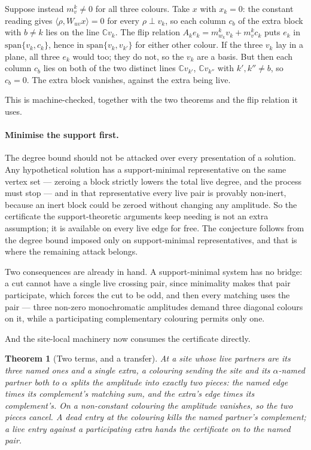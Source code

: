 \documentclass[11pt]{article}
\newtheorem{theorem}{Theorem}[section]
\theoremstyle{definition}
\theoremstyle{remark}
\begin{document}
Suppose instead $m_v^k \neq 0$ for all three colours. Take $x$ with $x_k = 0$: the constant
reading gives $\langle \rho, W_{uv}x\rangle = 0$ for every $\rho \perp v_k$, so each column
$c_b$ of the extra block with $b \neq k$ lies on the line $\mathbb{C}v_k$. The flip relation
$A_k e_k = m^k_{w_k} v_k + m^k_v c_k$ puts $e_k$ in $\mathrm{span}\{v_k, c_k\}$, hence in
$\mathrm{span}\{v_k, v_{k'}\}$ for either other colour. If the three $v_k$ lay in a plane,
all three $e_k$ would too; they do not, so the $v_k$ are a basis. But then each column $c_b$
lies on both of the two distinct lines $\mathbb{C}v_{k'}$, $\mathbb{C}v_{k''}$ with
$k',k'' \neq b$, so $c_b = 0$. The extra block vanishes, against the extra being live.

This is machine-checked, together with the two theorems and the flip relation it uses.

\paragraph{Minimise the support first.} The degree bound should not be attacked over every
presentation of a solution. Any hypothetical solution has a support-minimal representative on
the same vertex set --- zeroing a block strictly lowers the total live degree, and the process
must stop --- and in that representative every live pair is provably non-inert, because an
inert block could be zeroed without changing any amplitude. So the certificate the
support-theoretic arguments keep needing is not an extra assumption; it is available on every
live edge for free. The conjecture follows from the degree bound imposed only on
support-minimal representatives, and that is where the remaining attack belongs.

Two consequences are already in hand. A support-minimal system has no bridge: a cut cannot
have a single live crossing pair, since minimality makes that pair participate, which forces
the cut to be odd, and then every matching uses the pair --- three non-zero monochromatic
amplitudes demand three diagonal colours on it, while a participating complementary colouring
permits only one.

And the site-local machinery now consumes the certificate directly.

\begin{theorem}[Two terms, and a transfer]\label{thm:split}
At a site whose live partners are its three named ones and a single extra, a colouring
sending the site and its $\alpha$-named partner both to $\alpha$ splits the amplitude into
exactly two pieces: the named edge times its complement's matching sum, and the extra's edge
times its complement's. On a non-constant colouring the amplitude vanishes, so the two pieces
cancel. A dead entry at the colouring kills the named partner's complement; a live entry
against a participating extra hands the certificate on to the named pair.
\end{theorem}
\end{document}
